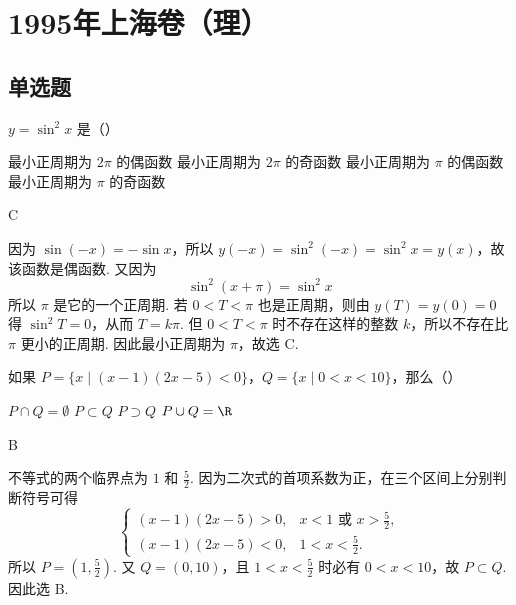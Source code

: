 \documentclass[UTF8,a4paper,oneside,11pt]{ctexbook}
\begin{document}
\mainmatter

\chapter{1995年上海卷（理）}
\section{单选题}

\begin{problem}
\(y=\sin^2 x\) 是（\quad）

\choices
    {最小正周期为 \(2\pi\) 的偶函数}
    {最小正周期为 \(2\pi\) 的奇函数}
    {最小正周期为 \(\pi\) 的偶函数}
    {最小正周期为 \(\pi\) 的奇函数}
\end{problem}

\begin{answer}
C
\end{answer}

\begin{solution}
因为 \(\sin(-x)=-\sin x\)，所以 \(y(-x)=\sin^2(-x)=\sin^2x=y(x)\)，故该函数是偶函数. 又因为
\[
\sin^2(x+\pi)=\sin^2x
\]
所以 \(\pi\) 是它的一个正周期. 若 \(0<T<\pi\) 也是正周期，则由 \(y(T)=y(0)=0\) 得 \(\sin^2T=0\)，从而 \(T=k\pi\). 但 \(0<T<\pi\) 时不存在这样的整数 \(k\)，所以不存在比 \(\pi\) 更小的正周期. 因此最小正周期为 \(\pi\)，故选 C.
\end{solution}

\begin{problem}
如果 \(P=\{x\mid (x-1)(2x-5)<0\}\)，\(Q=\{x\mid 0<x<10\}\)，那么（\quad）

\choices
    {\(P\cap Q=\emptyset\)}
    {\(P\subset Q\)}
    {\(P\supset Q\)}
    {\(P\cup Q=\R\)}
\end{problem}

\begin{answer}
B
\end{answer}

\begin{solution}
不等式的两个临界点为 \(1\) 和 \(\frac{5}{2}\). 因为二次式的首项系数为正，在三个区间上分别判断符号可得
\[
\begin{cases}
(x-1)(2x-5)>0,&x<1\text{ 或 }x>\frac52,\\
(x-1)(2x-5)<0,&1<x<\frac52.
\end{cases}
\]
所以 \(P=\left(1,\frac{5}{2}\right)\). 又 \(Q=(0,10)\)，且 \(1<x<\frac52\) 时必有 \(0<x<10\)，故 \(P\subset Q\). 因此选 B.
\end{solution}
\end{document}
